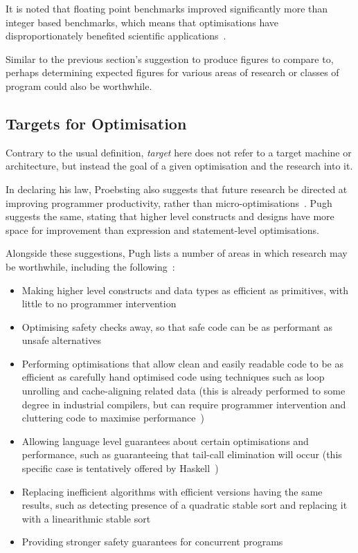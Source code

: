 It is noted that floating point benchmarks improved significantly more than integer based benchmarks, which means that optimisations have disproportionately benefited scientific applications~\cite{proebstingformal}.

Similar to the previous section's suggestion to produce figures to compare to, perhaps determining expected figures for various areas of research or classes of program could also be worthwhile.

\subsection{Targets for Optimisation}

Contrary to the usual definition, \textit{target} here does not refer to a target machine or architecture, but instead the goal of a given optimisation and the research into it.

In declaring his law, Proebsting also suggests that future research be directed at improving programmer productivity, rather than micro-optimisations~\cite{proebstingdecl}. Pugh suggests the same, stating that higher level constructs and designs have more space for improvement than expression and statement-level optimisations.

Alongside these suggestions, Pugh lists a number of areas in which research may be worthwhile, including the following~\cite{optimisationrelevant}:

\begin{itemize}
	\itemsep-0.25em
	\item Making higher level constructs and data types as efficient as primitives, with little to no programmer intervention
	\item Optimising safety checks away, so that safe code can be as performant as unsafe alternatives
	\item Performing optimisations that allow clean and easily readable code to be as efficient as carefully hand optimised code using techniques such as loop unrolling and cache-aligning related data (this is already performed to some degree in industrial compilers, but can require programmer intervention and cluttering code to maximise performance~\cite{gccloops})
	\item Allowing language level guarantees about certain optimisations and performance, such as guaranteeing that tail-call elimination will occur (this specific case is tentatively offered by Haskell~\cite{haskelltail})
	\item Replacing inefficient algorithms with efficient versions having the same results, such as detecting presence of a quadratic stable sort and replacing it with a linearithmic stable sort
	\item Providing stronger safety guarantees for concurrent programs
\end{itemize}

